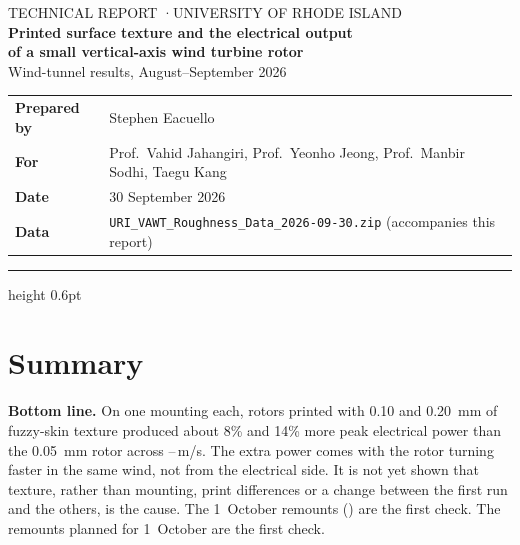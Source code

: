 \documentclass[11pt]{article}
\newcommand{\ReportDate}{30 September 2026}
\begin{document}
\thispagestyle{empty}
\begin{flushleft}
{\sffamily\small\color{ink2} TECHNICAL REPORT \quad·\quad UNIVERSITY OF RHODE ISLAND}\\[0.8em]
{\sffamily\LARGE\bfseries\color{navy} Printed surface texture and the electrical output\\[0.15em] of a small vertical-axis wind turbine rotor}\\[0.5em]
{\sffamily\large Wind-tunnel results, August–September 2026}\\[1.0em]
{\small
\begin{tabular}{@{}ll@{}}
\textbf{Prepared by} & Stephen Eacuello \\
\textbf{For}         & Prof.\ Vahid Jahangiri, Prof.\ Yeonho Jeong, Prof.\ Manbir Sodhi, Taegu Kang \\
\textbf{Date}        & \ReportDate \\
\textbf{Data}        & \texttt{URI\_VAWT\_Roughness\_Data\_2026-09-30.zip} (accompanies this report)
\end{tabular}}
\end{flushleft}
\vspace{0.2em}
{\color{rule}\hrule height 0.6pt}

\section*{Summary}

\begin{keybox}
\textbf{Bottom line.} On one mounting each, rotors printed with \SI{0.10}{} and
\SI{0.20}{mm} of fuzzy-skin texture produced about 8\% and 14\% more peak electrical power
than the \SI{0.05}{mm} rotor across \vlo–\vhi{}\,\si{m/s}. The extra power comes with the
rotor turning faster in the same wind, not from the electrical side. It is not yet shown that
texture, rather than mounting, print differences or a change between the first run and the
others, is the cause. \ifHaveRepeat The 1~October remounts () are the first check. \else The remounts planned for 1~October are the first check.\fi
\end{keybox}
\end{document}
